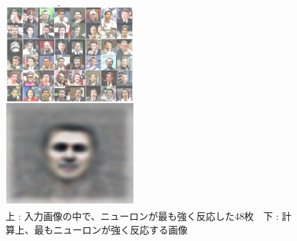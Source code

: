 \begin{figure}[tbp]
 \begin{center}
  \includegraphics[width=50mm]{img/c1/google_face}
 \end{center}
 \caption{上 : 入力画像の中で、ニューロンが最も強く反応した48枚　下 : 計算上、最もニューロンが強く反応する画像}
 \label{c1_facedetection}
\end{figure}


